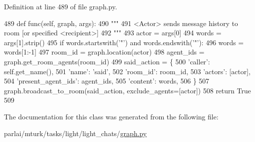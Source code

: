 Definition at line 489 of file graph.\+py.


\begin{DoxyCode}
489     \textcolor{keyword}{def }func(self, graph, args):
490         \textcolor{stringliteral}{"""}
491 \textcolor{stringliteral}{        <Actor> sends message history to room [or specified <recipient>]}
492 \textcolor{stringliteral}{        """}
493         actor = args[0]
494         words = args[1].strip()
495         \textcolor{keywordflow}{if} words.startswith(\textcolor{stringliteral}{'"'}) \textcolor{keywordflow}{and} words.endswith(\textcolor{stringliteral}{'"'}):
496             words = words[1:-1]
497         room\_id = graph.location(actor)
498         agent\_ids = graph.get\_room\_agents(room\_id)
499         said\_action = \{
500             \textcolor{stringliteral}{'caller'}: self.get\_name(),
501             \textcolor{stringliteral}{'name'}: \textcolor{stringliteral}{'said'},
502             \textcolor{stringliteral}{'room\_id'}: room\_id,
503             \textcolor{stringliteral}{'actors'}: [actor],
504             \textcolor{stringliteral}{'present\_agent\_ids'}: agent\_ids,
505             \textcolor{stringliteral}{'content'}: words,
506         \}
507         graph.broadcast\_to\_room(said\_action, exclude\_agents=[actor])
508         \textcolor{keywordflow}{return} \textcolor{keyword}{True}
509 
\end{DoxyCode}


The documentation for this class was generated from the following file\+:\begin{DoxyCompactItemize}
\item 
parlai/mturk/tasks/light/light\+\_\+chats/\hyperlink{parlai_2mturk_2tasks_2light_2light__chats_2graph_8py}{graph.\+py}\end{DoxyCompactItemize}
